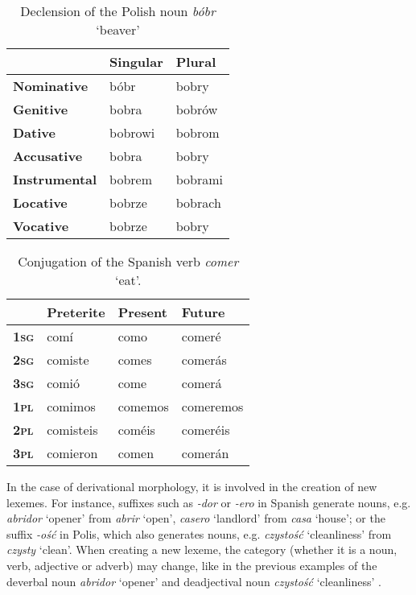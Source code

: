 \documentclass[12pt]{article}
\newcommand{\ita}[1]{\textit{#1}}
\begin{document}
\begin{table}[htbp]
    \centering
    \footnotesize
    \renewcommand{\arraystretch}{1.2} %
    \begin{tabular}{lll} 
        \toprule
        & \textbf{Singular} & \textbf{Plural} \\ 
        \midrule
        \textbf{Nominative}   & bóbr   & bobry \\
        \textbf{Genitive}     & bobra  & bobrów \\
        \textbf{Dative}       & bobrowi & bobrom \\
        \textbf{Accusative}    & bobra  & bobry \\
        \textbf{Instrumental} & bobrem & bobrami \\
        \textbf{Locative}     & bobrze & bobrach \\
        \textbf{Vocative}     & bobrze & bobry \\
        \bottomrule
    \end{tabular}
    \caption{Declension of the Polish noun \textit{bóbr} `beaver'}
    \label{tab:bobr}
\end{table}

\begin{table}[htbp]
    \centering
    \footnotesize
    \renewcommand{\arraystretch}{1.2} %
    \begin{tabular}{llll} 
        \toprule
        & \textbf{Preterite} & \textbf{Present} & \textbf{Future} \\ 
        \midrule
       \textbf{\textsc{1sg}}  & comí   & como   & comeré \\
       \textbf{\textsc{2sg}}  & comiste   & comes  & comerás \\
       \textbf{\textsc{3sg}}  & comió      & come & comerá \\
       \textbf{\textsc{1pl}}  & comimos    & comemos  & comeremos \\
       \textbf{\textsc{2pl}}  & comisteis  & coméis & comeréis \\
       \textbf{\textsc{3pl}}  & comieron     & comen & comerán \\
     \bottomrule
    \end{tabular}
    \caption{Conjugation of the Spanish verb \textit{comer} `eat'.}
    \label{tab:conjugation}
\end{table}

\noindent
In the case of derivational morphology, it is involved in the creation of new lexemes. For instance, suffixes such as \ita{-dor} or \ita{-ero} in Spanish generate nouns, e.g.  \ita{abridor} `opener' from \ita{abrir} `open', \ita{casero} `landlord' from \ita{casa} `house'; or the suffix \ita{-ość} in Polis, which also generates nouns, e.g. \ita{czystość} `cleanliness' from \ita{czysty} `clean'. When creating a new lexeme, the category (whether it is a noun, verb, adjective or adverb) may change, like in the previous examples of the deverbal noun \ita{abridor} `opener' and deadjectival noun \ita{czystość} `cleanliness' \parencite{haspelmath2013UnderstandingMorphology,booij2012GrammarWordsIntroduction}.
\end{document}
